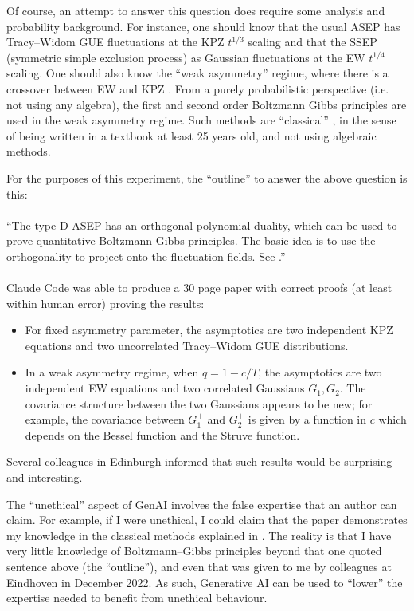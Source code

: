 \documentclass{article}
\begin{document}
Of course, an attempt to answer this question does require some analysis and probability background. For instance, one should know that the usual ASEP has Tracy--Widom GUE fluctuations at the KPZ \cite{KPZ} $t^{1/3}$ scaling  and that the SSEP (symmetric simple exclusion process) as Gaussian fluctuations at the EW \cite{EW} $t^{1/4}$ scaling. One should also know the ``weak asymmetry'' regime, where there is a crossover between EW and KPZ \cite{ACQ,GJ,GJS}. From a purely probabilistic perspective (i.e. not using any algebra), the first and second order Boltzmann Gibbs principles are used in the weak asymmetry regime. Such methods are ``classical'' \cite{KipnisLandim1999}, in the sense of being written in a textbook at least 25 years old, and not using algebraic methods. 

For the purposes of this experiment, the ``outline'' to answer the above question is this:
\\~\\
``The type D ASEP has an orthogonal polynomial duality, which can be used to prove quantitative Boltzmann Gibbs principles. The basic idea is to use the orthogonality to project onto the fluctuation fields. See \cite{ACR,ACR2}.''
\\~\\

Claude Code was able to produce a 30 page paper with correct proofs (at least within human error) proving the results:

\begin{itemize}
\item For fixed asymmetry parameter, the asymptotics are two independent KPZ equations and two uncorrelated Tracy--Widom GUE distributions.

\item In a weak asymmetry regime, when $q=1-c/T$, the asymptotics are two independent EW equations and two correlated Gaussians $G_1,G_2$. The covariance structure between the two Gaussians appears to be new; for example, the covariance between $G_1^+$ and $G_2^+$ is given by a function in $c$ which depends on the Bessel function and the Struve function.
\end{itemize}

Several colleagues in Edinburgh informed that such results would be surprising and interesting. 

The ``unethical'' aspect of GenAI involves the false expertise that an author can claim. For example, if I were unethical, I could claim that the paper demonstrates my knowledge in the classical methods explained in \cite{KipnisLandim1999}. The reality is that I have very little knowledge of Boltzmann--Gibbs principles beyond that one quoted sentence above (the ``outline''), and even that was given to me by colleagues at Eindhoven in December 2022. As such, Generative AI can be used to ``lower'' the expertise needed to benefit from unethical behaviour. 
\end{document}
